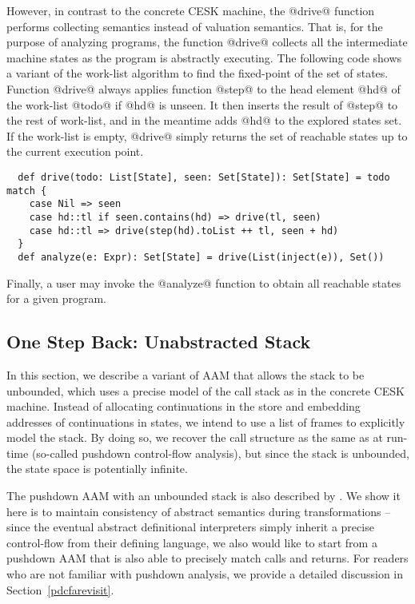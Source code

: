 \documentclass[acmsmall, screen]{acmart}\settopmatter{}
\begin{document}
However, in contrast to the concrete CESK machine, the @drive@ function performs
collecting semantics instead of valuation semantics. That is, for the purpose of
analyzing programs, the function @drive@ collects all the intermediate machine states
as the program is abstractly executing. The following code shows a variant of the
work-list algorithm to find the fixed-point of the set of states.
Function @drive@ always applies function @step@ to the head element @hd@ of
the work-list @todo@ if @hd@ is unseen. It then inserts the result of @step@ to
the rest of work-list, and in the meantime adds @hd@ to the explored states set.
If the work-list is empty, @drive@ simply returns the set of reachable states
up to the current execution point.

\begin{lstlisting}
  def drive(todo: List[State], seen: Set[State]): Set[State] = todo match {
    case Nil => seen
    case hd::tl if seen.contains(hd) => drive(tl, seen)
    case hd::tl => drive(step(hd).toList ++ tl, seen + hd)
  }
  def analyze(e: Expr): Set[State] = drive(List(inject(e)), Set())
\end{lstlisting}

Finally, a user may invoke the @analyze@ function to obtain all reachable states for
a given program.


\subsection{One Step Back: Unabstracted Stack} \label{unabs}

In this section, we describe a variant of AAM that allows the stack to be unbounded,
which uses a precise model of the call stack as in the concrete CESK machine.
Instead of allocating continuations in the store and embedding addresses of
continuations in states, we intend to use a list of frames to explicitly model
the stack. By doing so, we recover the call structure as the same as at run-time
(so-called pushdown control-flow analysis), but since the stack is unbounded,
the state space is potentially infinite.

The pushdown AAM with an unbounded stack is also described by \citeauthor{van2012systematic}
\cite{van2012systematic}.
We show it here is to maintain consistency of abstract semantics during
transformations -- since the eventual abstract definitional interpreters simply inherit
a precise control-flow from their defining language, we also would like to start from a
pushdown AAM that is also able to precisely match calls and returns.
For readers who are not familiar with pushdown analysis, we provide a detailed discussion
in Section~\ref{pdcfarevisit}.
\end{document}
